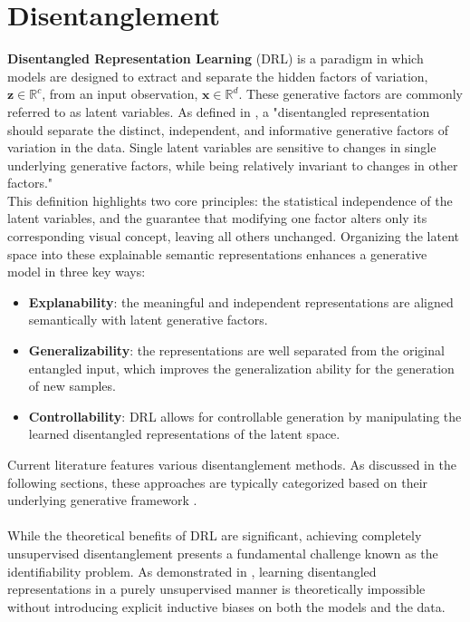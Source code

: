 \chapter{Disentanglement}\label{ch:disentanglement}

\textbf{Disentangled Representation Learning} (DRL) is a paradigm in which models are designed to extract and separate the hidden factors of variation, $\mathbf{z}\in\mathbb{R}^c$, from an input observation, $\mathbf{x}\in\mathbb{R}^d$. These generative factors are commonly referred to as latent variables. As defined in \cite{RepresentationLearning}, a "disentangled representation should separate the distinct, independent, and informative generative factors of variation in the data. Single latent variables are sensitive to changes in single underlying generative factors, while being relatively invariant to changes in other factors." \\
This definition highlights two core principles: the statistical independence of the latent variables, and the guarantee that modifying one factor alters only its corresponding visual concept, leaving all others unchanged. Organizing the latent space into these explainable semantic representations enhances a generative model in three key ways:  
\begin{itemize}
    \item \textbf{Explanability}: the meaningful and independent representations are aligned semantically with latent generative factors. 
    \item \textbf{Generalizability}: the representations are well separated from the original entangled input, which improves the generalization ability for the generation of new samples. 
    \item \textbf{Controllability}: DRL allows for controllable generation by manipulating the learned disentangled representations of the latent space.  
\end{itemize}
Current literature features various disentanglement methods. As discussed in the following sections, these approaches are typically categorized based on their underlying generative framework \cite{wang2024disentangledrepresentationlearning}. \\
\\
While the theoretical benefits of DRL are significant, achieving completely unsupervised disentanglement presents a fundamental challenge known as the identifiability problem. As demonstrated in \cite{locatello2019challengingcommonassumptionsunsupervised}, learning disentangled representations in a purely unsupervised manner is theoretically impossible without introducing explicit inductive biases on both the models and the data.  \\
